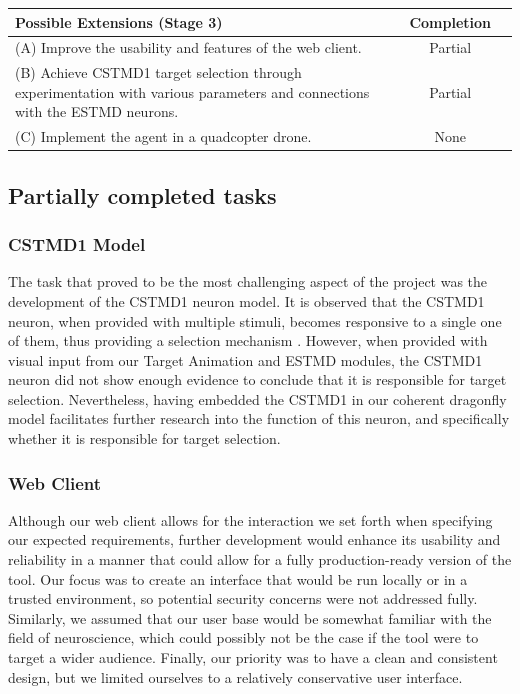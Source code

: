\documentclass[a4paper,11pt]{article}
\begin{document}
\begin{center}
    \begin{tabular}{p{12cm} c c}
    \textbf{Possible Extensions (Stage 3)} & \textbf{Completion} \\ \hline
	(A) Improve the usability and features of the web client. & Partial\\
	(B) Achieve CSTMD1 target selection through experimentation with various parameters and connections with the ESTMD neurons. & Partial\\
	(C) Implement the agent in a quadcopter drone. & None\\
    \end{tabular}
\end{center}

\subsection{Partially completed tasks}

\subsubsection{CSTMD1 Model}

The task that proved to be the most challenging aspect of the project was the development of the 
CSTMD1 neuron model. It is observed that the CSTMD1 neuron, when provided with multiple stimuli,
becomes responsive to a single one of them, thus providing a selection mechanism \cite{w13}.
However, when provided with visual input from our Target Animation and ESTMD modules, the CSTMD1
neuron did not show enough evidence to conclude that it is responsible for target selection. Nevertheless, having embedded the CSTMD1 in our coherent dragonfly model facilitates further research into the function of this neuron, and specifically whether it is responsible for target selection.

\subsubsection{Web Client}

Although our web client allows for the interaction we set forth when specifying our expected requirements,
further development would enhance its usability and reliability in a manner that could allow for a fully
production-ready version of the tool. Our focus was to create an interface that would be run locally or in a
trusted environment, so potential security concerns were not addressed fully. Similarly, we assumed that
our user base would be somewhat familiar with the field of neuroscience, which could possibly not be the
case if the tool were to target a wider audience. Finally, our priority was to have a clean and consistent
design, but we limited ourselves to a relatively conservative user interface.
\end{document}
